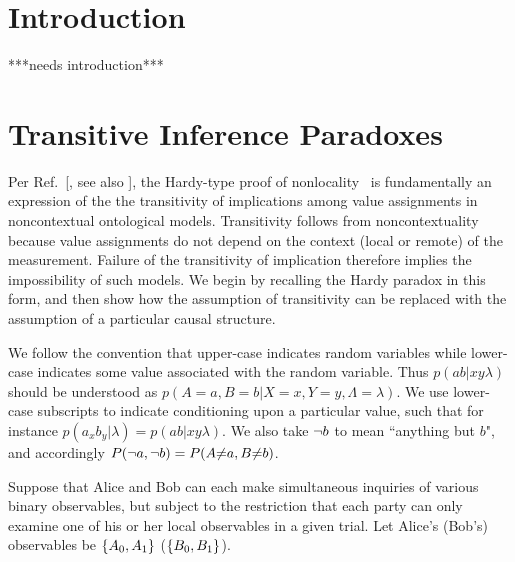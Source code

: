 \section{Introduction}
***needs introduction***

\section{Transitive Inference Paradoxes}

Per Ref.~[\citealp[]{LSW}, see also \citealp[]{H.Stapp:Hardy:Transitivity,D.Boschi:PRL:2755,Mermin,Unruh}], the Hardy-type proof of nonlocality~\cite{L.Hardy:PRL:1665} is fundamentally an expression of the the transitivity of implications among value assignments in noncontextual ontological models. Transitivity follows from noncontextuality because value assignments do not depend on the context (local or remote) of the measurement. Failure of the transitivity of implication therefore implies the impossibility of such models. We begin by recalling the Hardy paradox in this form, and then show how the assumption of transitivity can be replaced with the assumption of a particular causal structure. 

We follow the convention that upper-case indicates random variables while lower-case indicates some value associated with the random variable. Thus $p(ab|xy\lambda)$ should be understood as ${p(A\mathopen{=}a,B\mathopen{=}b|X\mathopen{=}x,Y\mathopen{=}y,\Lambda\mathopen{=}\lambda)}$. We use lower-case subscripts to indicate conditioning upon a particular value, such that for instance $p(a_x b_y|\lambda)=p(ab|xy\lambda)$. We also take $\lnot b$ to mean ``anything but $b$", and accordingly $P(\lnot a,\lnot b)=P(A\mathopen{\neq}a,B\mathopen{\neq}b)$.

Suppose that Alice and Bob can each make simultaneous inquiries of various binary observables, but subject to the restriction that each party can only examine one of his or her local observables in a given trial. Let Alice's (Bob's) observables be $\lbrace{A_0,A_1\rbrace}$ ($\lbrace{B_0,B_1\rbrace}$).

